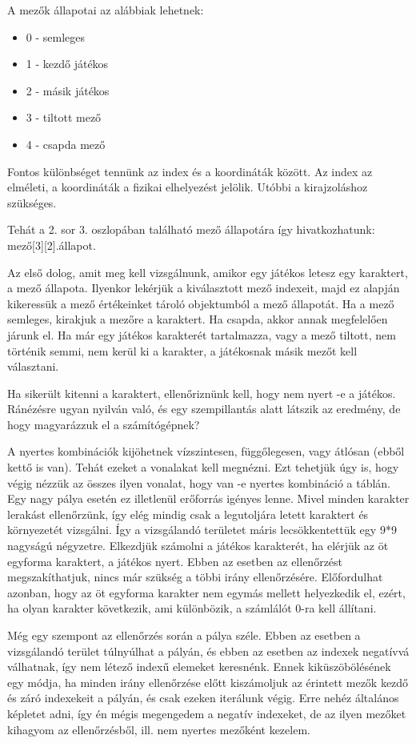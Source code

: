 A mezők állapotai az alábbiak lehetnek:
\begin{itemize}	
	\item 0 - semleges
	\item 1 - kezdő játékos
	\item 2 - másik játékos
	\item 3 - tiltott mező
	\item 4 - csapda mező
\end{itemize}

Fontos különbséget tennünk az index és a koordináták között. Az index az elméleti, a koordináták a fizikai elhelyezést jelölik. Utóbbi a kirajzoláshoz szükséges.

Tehát a 2. sor 3. oszlopában található mező állapotára így hivatkozhatunk: mező[3][2].állapot.


Az első dolog, amit meg kell vizsgálnunk, amikor egy játékos letesz egy karaktert, a mező állapota. Ilyenkor lekérjük a kiválasztott mező indexeit, majd ez alapján kikeressük a mező értékeinket tároló objektumból a mező állapotát. Ha a mező semleges, kirakjuk a mezőre a karaktert. Ha csapda, akkor annak megfelelően járunk el. Ha már egy játékos karakterét tartalmazza, vagy a mező tiltott, nem történik semmi, nem kerül ki a karakter, a játékosnak másik mezőt kell választani.

Ha sikerült kitenni a karaktert, ellenőriznünk kell, hogy nem nyert -e a játékos. Ránézésre ugyan nyilván való, és egy szempillantás alatt látszik az eredmény, de hogy magyarázzuk el a számítógépnek?

A nyertes kombinációk kijöhetnek vízszintesen, függőlegesen, vagy átlósan (ebből kettő is van). Tehát ezeket a vonalakat kell megnézni. Ezt tehetjük úgy is, hogy végig nézzük az összes ilyen vonalat, hogy van -e nyertes kombináció a táblán. Egy nagy pálya esetén ez illetlenül erőforrás igényes lenne. Mivel minden karakter lerakást ellenőrzünk, így elég mindig csak a legutoljára letett karaktert és környezetét vizsgálni. Így a vizsgálandó területet máris lecsökkentettük egy 9*9 nagyságú négyzetre. Elkezdjük számolni a játékos karakterét, ha elérjük az öt egyforma karaktert, a játékos nyert. Ebben az esetben az ellenőrzést megszakíthatjuk, nincs már szükség a többi irány ellenőrzésére. Előfordulhat azonban, hogy az öt egyforma karakter nem egymás mellett helyezkedik el, ezért, ha olyan karakter következik, ami különbözik, a számlálót 0-ra kell állítani.

Még egy szempont az ellenőrzés során a pálya széle. Ebben az esetben a vizsgálandó terület túlnyúlhat a pályán, és ebben az esetben az indexek negatívvá válhatnak, így nem létező indexű elemeket keresnénk. Ennek kiküszöbölésének egy módja, ha minden irány ellenőrzése előtt kiszámoljuk az érintett mezők kezdő és záró indexekeit a pályán, és csak ezeken iterálunk végig. Erre nehéz általános képletet adni, így én mégis megengedem a negatív indexeket, de az ilyen mezőket kihagyom az ellenőrzésből,  ill. nem nyertes mezőként kezelem.


